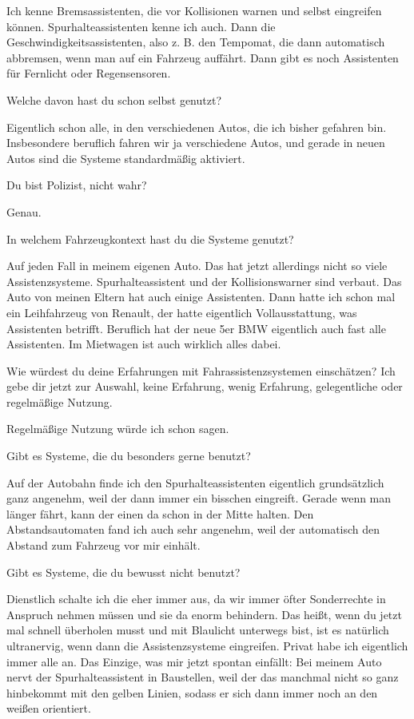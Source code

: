 Ich kenne Bremsassistenten, die vor Kollisionen warnen und selbst
eingreifen können. Spurhalteassistenten kenne ich auch. Dann die
Geschwindigkeitsassistenten, also z. B. den Tempomat, die dann
automatisch abbremsen, wenn man auf ein Fahrzeug auffährt. Dann gibt es
noch Assistenten für Fernlicht oder Regensensoren.

\interviewerin
Welche davon hast du schon selbst genutzt?

Eigentlich schon alle, in den verschiedenen Autos, die ich bisher
gefahren bin. Insbesondere beruflich fahren wir ja verschiedene Autos,
und gerade in neuen Autos sind die Systeme standardmäßig aktiviert.

\interviewerin
Du bist Polizist, nicht wahr?

Genau.

\interviewerin
In welchem Fahrzeugkontext hast du die Systeme genutzt?

Auf jeden Fall in meinem eigenen Auto. Das hat jetzt allerdings nicht
so viele Assistenzsysteme. Spurhalteassistent und der Kollisionswarner
sind verbaut. Das Auto von meinen Eltern hat auch einige Assistenten.
Dann hatte ich schon mal ein Leihfahrzeug von Renault, der hatte
eigentlich Vollausstattung, was Assistenten betrifft. Beruflich hat der
neue 5er BMW eigentlich auch fast alle Assistenten. Im Mietwagen ist
auch wirklich alles dabei.

\interviewerin
Wie würdest du deine Erfahrungen mit Fahrassistenzsystemen einschätzen?
Ich gebe dir jetzt zur Auswahl, keine Erfahrung, wenig Erfahrung,
gelegentliche oder regelmäßige Nutzung.

Regelmäßige Nutzung würde ich schon sagen.

\interviewerin
Gibt es Systeme, die du besonders gerne benutzt?

Auf der Autobahn finde ich den Spurhalteassistenten eigentlich
grundsätzlich ganz angenehm, weil der dann immer ein bisschen eingreift.
Gerade wenn man länger fährt, kann der einen da schon in der Mitte
halten. Den Abstandsautomaten fand ich auch sehr angenehm, weil der
automatisch den Abstand zum Fahrzeug vor mir einhält.

\interviewerin
Gibt es Systeme, die du bewusst nicht benutzt?

Dienstlich schalte ich die eher immer aus, da wir immer öfter
Sonderrechte in Anspruch nehmen müssen und sie da enorm behindern. Das
heißt, wenn du jetzt mal schnell überholen musst und mit Blaulicht
unterwegs bist, ist es natürlich ultranervig, wenn dann die
Assistenzsysteme eingreifen. Privat habe ich eigentlich immer alle an.
Das Einzige, was mir jetzt spontan einfällt: Bei meinem Auto nervt der
Spurhalteassistent in Baustellen, weil der das manchmal nicht so ganz
hinbekommt mit den gelben Linien, sodass er sich dann immer noch an den
weißen orientiert.

